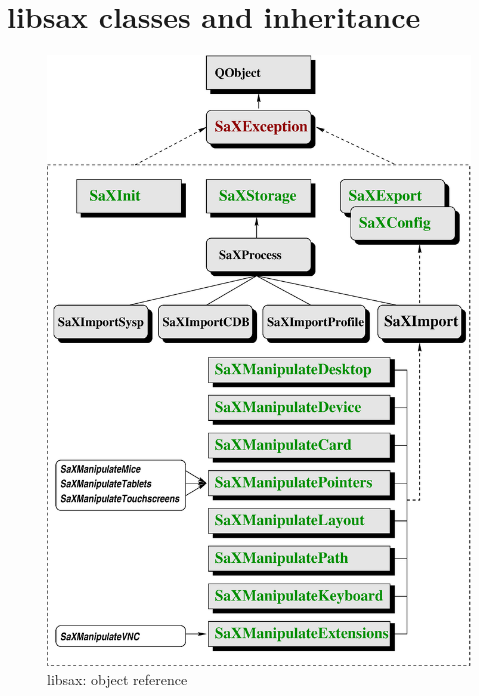\section{libsax classes and inheritance}
\begin{figure}[h]
\caption{libsax: object reference}
\vspace*{0.1cm}
\includegraphics[scale=0.5]{pictures/tree.eps}
\end{figure}
